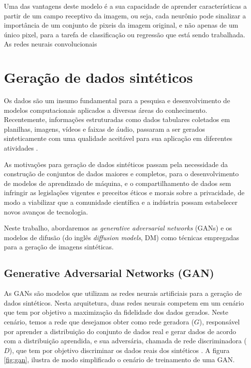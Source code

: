 Uma das vantagens deste modelo é a sua capacidade de aprender características a partir de um campo receptivo da imagem, ou seja, cada neurônio pode sinalizar a importância de um conjunto de pixeis da imagem original, e não apenas de um único pixel, para a tarefa de classificação ou regressão que está sendo trabalhada. As redes neurais convolucionais

\section{Geração de dados sintéticos}

Os dados são um insumo fundamental para a pesquisa e desenvolvimento de modelos computacionais aplicados a diversas áreas do conhecimento. Recentemente, informações estruturadas como dados tabulares coletados em planilhas, imagens, vídeos e faixas de áudio, passaram a ser gerados sinteticamente com uma qualidade aceitável para sua aplicação em diferentes atividades \cite{dhariwalDiffusionModelsBeat2021}.

As motivações para geração de dados sintéticos passam pela necessidade da construção de conjuntos de dados maiores e completos, para o desenvolvimento de modelos de aprendizado de máquina, e o compartilhamento de dados sem infringir as legislações vigentes e preceitos éticos e morais sobre a privacidade, de modo a viabilizar que a comunidade científica e a indústria possam estabelecer novos avanços de tecnologia.

Neste trabalho, abordaremos as \textit{generative adversarial networks} (GANs) e os modelos de difusão (do inglês \textit{diffusion models}, DM) como técnicas empregadas para a geração de imagens sintéticas.

\subsection{Generative Adversarial Networks (GAN)}

As GANs são modelos que utilizam as redes neurais artificiais para a geração de dados sintéticos. Nesta arquitetura, duas redes neurais competem em um cenário que tem por objetivo a maximização da fidelidade dos dados gerados. Neste cenário, temos a rede que desejamos obter como rede geradora ($G$), responsável por aprender a distribuição do conjunto de dados real e gerar dados de acordo com a distribuição aprendida, e sua adversária, chamada de rede discriminadora ($D$), que tem por objetivo discriminar os dados reais dos sintéticos \cite{goodfellowDeepLearning2016}. A figura \ref{fig:gan}, ilustra de modo simplificado o cenário de treinamento de uma GAN.

